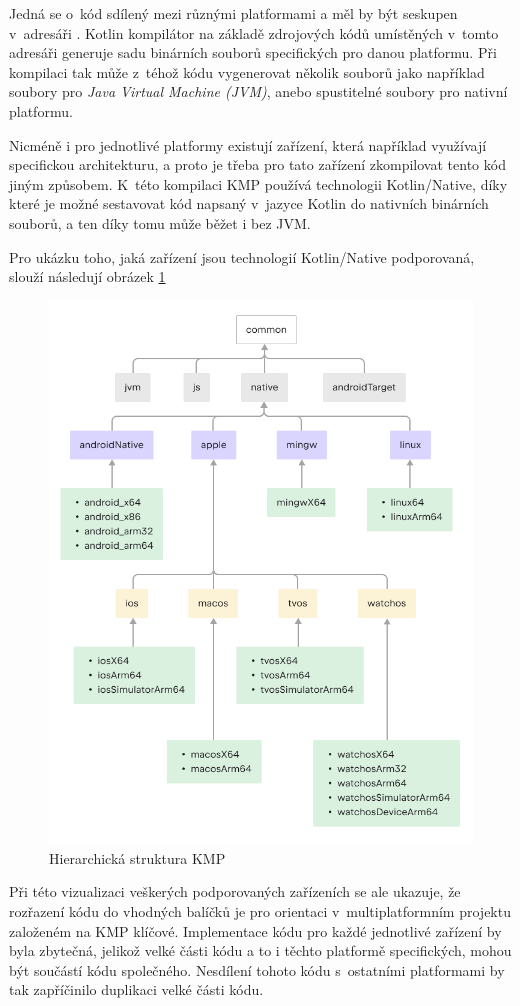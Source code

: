 Jedná se o~kód sdílený mezi různými platformami a měl by být seskupen v~adresáři . \cite{KMPCommonCode}
Kotlin kompilátor na základě zdrojových kódů umístěných v~tomto adresáři generuje sadu binárních souborů specifických pro danou platformu. \cite{KMPCommonCode}
Při kompilaci tak může z~téhož kódu vygenerovat několik souborů jako například soubory pro \textit{Java Virtual Machine (JVM)}, 
anebo spustitelné soubory pro nativní platformu. \cite{KMPCommonCode}

Nicméně i pro jednotlivé platformy existují zařízení, která například využívají specifickou architekturu, a proto je třeba pro 
tato zařízení zkompilovat tento kód jiným způsobem.
K~této kompilaci KMP používá technologii Kotlin/Native, díky které
je možné sestavovat kód napsaný v~jazyce Kotlin do nativních binárních souborů, a ten díky tomu může běžet i bez JVM. \cite{kotlinNative}

Pro ukázku toho, jaká zařízení jsou technologií Kotlin/Native podporovaná, slouží následují obrázek \ref{fig:KMP_struktura}

\begin{figure}[H]
  \centering
  \includegraphics[width=.7\textwidth]{full-template-hierarchy.png}
  \caption{Hierarchická struktura KMP \cite{KMPHierarchi}}
  \label{fig:KMP_struktura}
\end{figure}

Při této vizualizaci veškerých podporovaných zařízeních se ale ukazuje, že rozřazení kódu do vhodných balíčků je pro orientaci
v~multiplatformním projektu založeném na KMP klíčové. Implementace kódu pro každé jednotlivé zařízení by byla zbytečná, jelikož
velké části kódu a to i těchto platformě specifických, mohou být součástí kódu společného. Nesdílení tohoto kódu s~ostatními platformami
by tak zapříčinilo duplikaci velké části kódu. 

